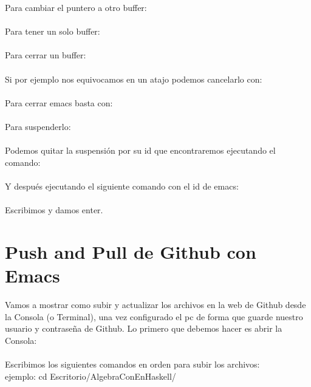 Para cambiar el puntero a otro buffer:\\
\\

Para tener un solo buffer:\\
\\

Para cerrar un buffer:\\
\\

Si por ejemplo nos equivocamos en un atajo podemos cancelarlo con:\\
\\

Para cerrar emacs basta con:\\
\\

Para suspenderlo:\\
\\

Podemos quitar la suspensión por su id que encontraremos ejecutando el comando:\\

\\

Y después ejecutando el siguiente comando con el id de emacs:\\

\\

Escribimos  y damos enter. \\


\section{Push and Pull de Github con Emacs}

Vamos a mostrar como subir y actualizar los archivos en la web de Github desde la Consola (o Terminal), una vez configurado el pc de forma que guarde nuestro usuario y contraseña de Github. Lo primero que debemos hacer es abrir la Consola:\\

\\

Escribimos los siguientes comandos en orden para subir los archivos:\\

 ejemplo: cd Escritorio/AlgebraConEnHaskell/ \\

